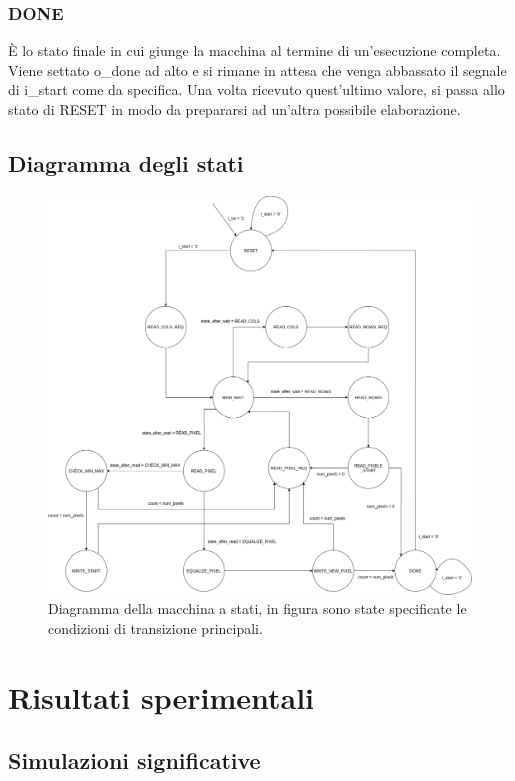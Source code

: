 \documentclass{article}
\begin{document}
\subsubsection{DONE}
È lo stato finale in cui giunge la macchina al termine di un'esecuzione completa. Viene settato o\_done ad alto e si rimane in attesa che venga abbassato il segnale di i\_start come da specifica. Una volta ricevuto quest'ultimo valore, si passa allo stato di RESET in modo da prepararsi ad un'altra possibile elaborazione.

\subsection{Diagramma degli stati}
\begin{figure}[h]
    \includegraphics[width=\textwidth]{diagram.png}
    \centering
    \caption{Diagramma della macchina a stati, in figura sono state specificate le condizioni di transizione principali.}
\end{figure}

\pagebreak

\section{Risultati sperimentali}
\subsection{Simulazioni significative}
\end{document}
